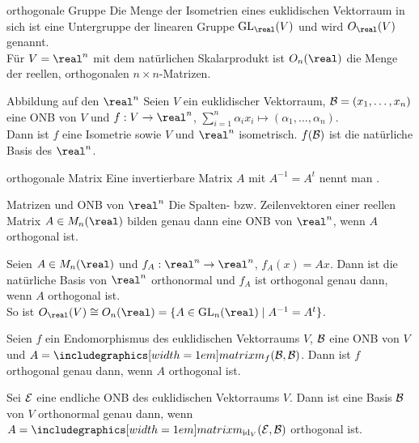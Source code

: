 \begin{Def}{orthogonale Gruppe}
    Die Menge der Isometrien eines euklidischen Vektorraum in sich ist eine
    Untergruppe der linearen Gruppe $\GL_\real(V)$ und wird
     $O_\real(V)$ genannt. \\
    Für $V = \real^n$ mit dem natürlichen Skalarprodukt ist $O_n(\real)$
    die Menge der reellen, orthogonalen $n \times n$-Matrizen.
\end{Def}

\begin{Satz}{Abbildung auf den $\real^n$}
    Seien $V$ ein euklidischer Vektorraum, $\mathcal{B} = (x_1, \ldots, x_n)$
    eine ONB von $V$ und
    $f: V \rightarrow \real^n$,
    $\sum_{i=1}^n \alpha_i x_i \mapsto (\alpha_1, \ldots, \alpha_n)$. \\
    Dann ist $f$ eine Isometrie sowie $V$ und $\real^n$ isometrisch.
    $f(\mathcal{B})$ ist die natürliche Basis des $\real^n$.
\end{Satz}

\begin{Def}{orthogonale Matrix}
    Eine invertierbare Matrix $A$ mit $A^{-1} = A^t$ nennt man
    .
\end{Def}

\begin{Lemma}{Matrizen und ONB von $\real^n$}
    Die Spalten- bzw. Zeilenvektoren einer reellen Matrix $A \in M_n(\real)$
    bilden genau dann eine ONB von $\real^n$, wenn
    $A$ orthogonal ist.
\end{Lemma}

\begin{Kor}
    Seien $A \in M_n(\real)$ und
    $f_A: \real^n \rightarrow \real^n$, $f_A(x) = Ax$.
    Dann ist die natürliche Basis von $\real^n$ orthonormal und
    $f_A$ ist orthogonal genau dann, wenn $A$ orthogonal ist. \\
    So ist $O_\real(V) \cong O_n(\real) =
    \{A \in \GL_n(\real) \;|\; A^{-1} = A^t\}$.
\end{Kor}

\begin{Kor}
    Seien $f$ ein Endomorphismus des euklidischen Vektorraums $V$,
    $\mathcal{B}$ eine ONB von $V$ und $A = \hommatrix{f}{B}{B}$.
    Dann ist $f$ orthogonal genau dann, wenn $A$ orthogonal ist.
\end{Kor}

\begin{Kor}
    Sei $\mathcal{E}$ eine endliche ONB des euklidischen Vektorraums $V$.
    Dann ist eine Basis $\mathcal{B}$ von $V$ orthonormal genau dann, wenn
    $A = \hommatrix{\id_V}{E}{B}$ orthogonal ist.
\end{Kor}

